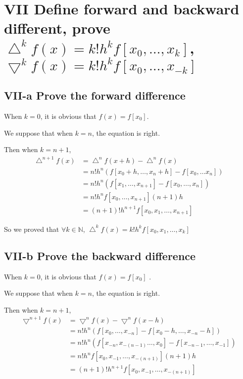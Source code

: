 \documentclass[twoside,a4paper]{article}
\begin{document}
\section*{VII \small{Define forward and backward different, prove 
$\bigtriangleup^{k}f\left( x \right)=k!h^{k}f[x_{0},\ldots,x_{k}] $,
$\bigtriangledown^{k}f\left( x \right)=k!h^{k}f[x_{0},\ldots,x_{-k}] $}}

\subsection*{VII-a \small{Prove the forward difference}}
When $k=0$, it is obvious that $f\left( x \right)=f[x_0]$.

We suppose that when $k=n$, the equation is right.

Then when  $k=n+1$, 
\begin{equation*}
\begin{split}
\bigtriangleup^{n+1}f\left( x \right)&=\bigtriangleup^{n}f\left( x+h \right)-\bigtriangleup^{n}f\left( x \right)\\
&=n!h^{n}\left( f[x_0+h,\ldots,x_{n}+h]-f[x_0,\ldots x_{n}] \right)\\
&=n!h^{n}\left( f[x_1,\ldots,x_{n+1}]-f[x_0,\ldots,x_{n}] \right)\\ 
&=n!h^{n}f[x_0,\ldots,x_{n+1}]\left( n+1 \right)h\\
&=\left( n+1 \right)!h^{n+1}f[x_0,x_1,\ldots,x_{n+1}] 
\end{split}
\end{equation*}

So we proved that $\forall k\in\mathbb{N}$, 
$\bigtriangleup^{k}f\left( x \right)=k!h^{k}f[x_{0},x_1,\ldots,x_{k}] $

\subsection*{VII-b \small{Prove the backward difference}}

When $k=0$, it is obvious that $f( x )=f[x_0]$ .

We suppose that when $k=n$, the equation is right.

Then when $k=n+1$,
\begin{equation*}
\begin{split}
\bigtriangledown^{n+1}f\left( x \right) &=\bigtriangledown^{n}f\left( x \right) -\bigtriangledown^{n}f\left( x-h \right) \\
&=n!h^{n}\left( f[x_0,\ldots,x_{-n}]-f[x_0-h,\ldots, x_{-n}-h]\right)\\
&=n!h^{n}\left( f[x_{-n},x_{-\left( n-1 \right) }\ldots,x_{0}]-f[x_{-n-1},\ldots,x_{-1}] \right)\\ 
&=n!h^{n}f[x_0,x_{-1},\ldots,x_{-\left( n+1 \right)}]\left( n+1 \right)h\\
&=( n+1 )!h^{n+1}f[x_0,x_{-1},\ldots,x_{-\left( n+1 \right) }] 
\end{split}
\end{equation*}
\end{document}
